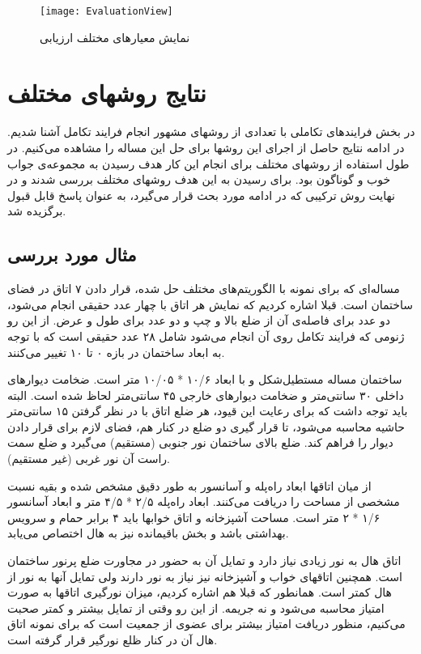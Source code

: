 \documentclass{report}
\begin{document}
 \begin{figure} \centerline{\texttt{[image: EvaluationView]}} \caption{\label{fEvaluationView}
نمایش معیارهای مختلف ارزیابی
 } \end{figure}

\section{نتایج روشهای مختلف}
در بخش فرایندهای تکاملی با تعدادی از روشهای مشهور انجام فرایند تکامل آشنا شدیم. در ادامه نتایج حاصل از اجرای این روشها برای حل این مساله را مشاهده می‌کنیم. در طول استفاده از روشهای مختلف برای انجام این کار هدف رسیدن به مجموعه‌ی جواب خوب و گوناگون بود. برای رسیدن به این هدف روشهای مختلف بررسی شدند و در نهایت روش ترکیبی که در ادامه مورد بحث قرار می‌گیرد، به عنوان پاسخ قابل قبول برگزیده شد. 

\subsection{مثال مورد بررسی}
مساله‌ای که برای نمونه با الگوریتم‌های مختلف حل شده، قرار دادن ۷ اتاق در فضای ساختمان است. قبلا اشاره کردیم که نمایش هر اتاق با چهار عدد حقیقی انجام می‌شود، دو عدد برای فاصله‌ی آن از ضلع بالا و چپ و دو عدد برای طول و عرض. از این رو ژنومی که فرایند تکامل روی آن انجام می‌شود شامل ۲۸ عدد حقیقی است که با توجه به ابعاد ساختمان در بازه ۰ تا ۱۰ تغییر می‌کنند.

ساختمان مساله مستطیل‌شکل و با ابعاد ۱۰/۶ * ۱۰/۰۵ متر است. ضخامت دیوارهای داخلی ۳۰ سانتی‌متر و ضخامت دیوارهای خارجی ۴۵ سانتی‌متر لحاظ شده است. البته باید توجه داشت که برای رعایت این قیود، هر ضلع اتاق با در نظر گرفتن ۱۵ سانتی‌متر حاشیه محاسبه می‌شود، تا قرار گیری دو ضلع در کنار هم، فضای لازم برای قرار دادن دیوار را فراهم کند. ضلع بالای ساختمان نور جنوبی (مستقیم) می‌گیرد و ضلع سمت راست آن نور غربی (غیر مستقیم).

از میان اتاقها ابعاد راه‌پله و آسانسور به طور دقیق مشخص شده و بقیه نسبت مشخصی از مساحت را دریافت می‌کنند. ابعاد راه‌پله ۲/۵ * ۴/۵ متر و ابعاد آسانسور ۱/۶ *‌ ۲ متر است. مساحت آشپزخانه و اتاق خوابها باید ۴ برابر حمام و سرویس بهداشتی باشد و بخش باقیمانده نیز به هال اختصاص می‌یابد.

اتاق هال به نور زیادی نیاز دارد و تمایل آن به حضور در مجاورت ضلع پرنور ساختمان است. همچنین اتاقهای خواب و آشپزخانه نیز نیاز به نور دارند ولی تمایل آنها به نور از هال کمتر است. همانطور که قبلا هم اشاره کردیم، میزان نورگیری اتاقها به صورت امتیاز محاسبه می‌شود و نه جریمه. از این رو وقتی از تمایل بیشتر و کمتر صحبت می‌کنیم، منظور دریافت امتیاز بیشتر برای عضوی از جمعیت است که برای نمونه اتاق هال آن در کنار ظلع نورگیر قرار گرفته است.
\end{document}

